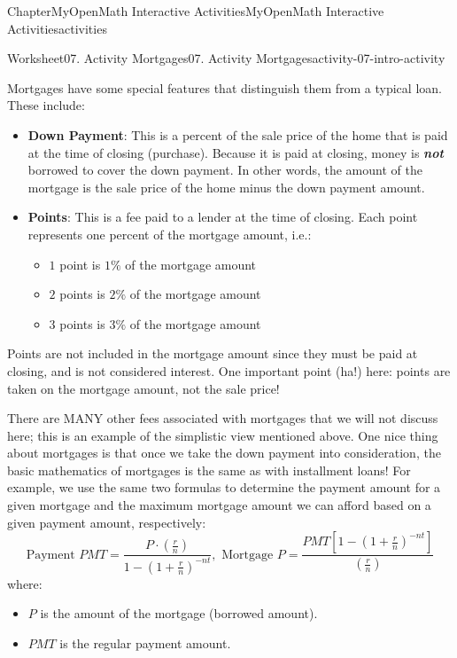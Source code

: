 \documentclass[oneside,10pt,]{book}
\newcommand{\ptxlistdisc}{\raisebox{0.3ex}{\textbullet}}
\newcommand{\ptxlistcircle}{\raisebox{0.3ex}{\textopenbullet}}
\newcommand{\alert}[1]{\textbf{\textit{#1}}}
\newcommand{\terminology}[1]{\textbf{#1}}
\begin{document}
\begin{chapterptx}{Chapter}{MyOpenMath Interactive Activities}{}{MyOpenMath Interactive Activities}{}{}{activities}
\begin{worksheet-section}{Worksheet}{07. Activity Mortgages}{}{07. Activity Mortgages}{}{}{activity-07-intro-activity}
\par
Mortgages have some special features that distinguish them from a typical loan. These include:%
\begin{itemize}[label=\ptxlistdisc]
\item{}\terminology{Down Payment}: This is a percent of the sale price of the home that is paid at the time of closing (purchase). Because it is paid at closing, money is \alert{not} borrowed to cover the down payment. In other words, the amount of the mortgage is the sale price of the home minus the down payment amount.%
\item{}\terminology{Points}: This is a fee paid to a lender at the time of closing. Each point represents one percent of the mortgage amount, i.e.:%
\begin{itemize}[label=\ptxlistcircle]
\item{}\(1\) point is \(1\%\) of the mortgage amount%
\item{}\(2\) points is \(2\%\) of the mortgage amount%
\item{}\(3\) points is \(3\%\) of the mortgage amount%
\end{itemize}
%
\end{itemize}
%
\par
Points are not included in the mortgage amount since they must be paid at closing, and is not considered interest. One important point (ha!) here: points are taken on the mortgage amount, not the sale price!%
\par
There are MANY other fees associated with mortgages that we will not discuss here; this is an example of the simplistic view mentioned above. One nice thing about mortgages is that once we take the down payment into consideration, the basic mathematics of mortgages is the same as with installment loans! For example, we use the same two formulas to determine the payment amount for a given mortgage and the maximum mortgage amount we can afford based on a given payment amount, respectively:%
\begin{equation*}
{\text{Payment }} PMT = \frac{P \cdot (\frac{r}{n})}{1 - \left(1 + \frac{r}{n}\right)^{-nt}}, 
{\text{ Mortgage }} P = \frac{PMT\left[1 - \left(1 + \frac{r}{n}\right)^{-nt}\right]}{(\frac{r}{n})} 
\end{equation*}
where:%
\begin{itemize}[label=\ptxlistdisc]
\item{}\(P\) is the amount of the mortgage (borrowed amount).%
\item{}\(PMT\) is the regular payment amount.%

\end{itemize}
\end{worksheet-section}
\end{chapterptx}
\end{document}
